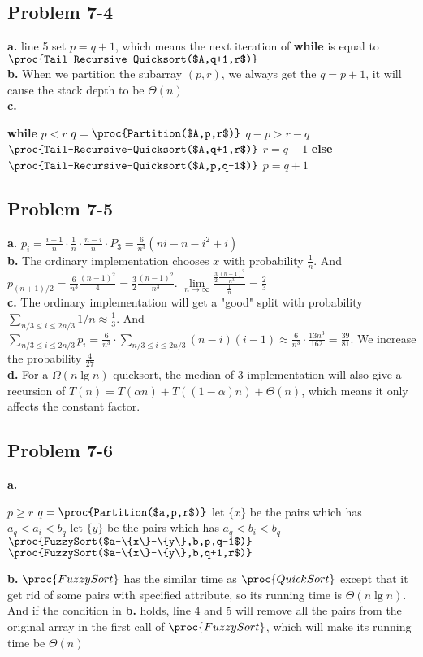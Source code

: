 \documentclass[12pt]{article}
\theoremstyle{definition}
\theoremstyle{remark}
\begin{document}
\subsection*{Problem 7-4}
\textbf{a.} line 5 set $p=q+1$, which means the next iteration of \textbf{while} is equal to $\proc{Tail-Recursive-Quicksort($A,q+1,r$)}$\\
\textbf{b.} When we partition the subarray $(p,r)$, we always get the $q=p+1$, it will cause the stack depth to be $\Theta(n)$\\
\textbf{c.}
\begin{codebox}
\li \textbf{while} $p<r$
\li $q=\proc{Partition($A,p,r$)}$
\li \If $q-p > r-q$
\li \quad $\proc{Tail-Recursive-Quicksort($A,q+1,r$)}$
\li \quad $r=q-1$
\li \textbf{else}
\li \quad $\proc{Tail-Recursive-Quicksort($A,p,q-1$)}$
\li \quad $p=q+1$
\end{codebox}
\subsection*{Problem 7-5}
\textbf{a.} $p_i=\frac{i-1}{n}\cdot\frac{1}{n}\cdot\frac{n-i}{n}\cdot P_3=\frac{6}{n^3}(ni-n-i^2+i)$\\
\textbf{b.} The ordinary implementation chooses $x$ with probability $\frac{1}{n}$. And $p_{(n+1)/2}=\frac{6}{n^3}\frac{(n-1)^2}{4}=\frac{3}{2}\frac{(n-1)^2}{n^3}$. $\lim\limits_{n\to \infty}\frac{\frac{3}{2}\frac{(n-1)^2}{n^3}}{\frac{1}{n}}=\frac{2}{3}$\\
\textbf{c.} The ordinary implementation will get a "good" split with probability $\sum\limits_{n/3\le i\le 2n/3}{1/n}\approx\frac{1}{3}$. And $\sum\limits_{n/3\le i\le 2n/3}p_i=\frac{6}{n^3}\cdot\sum\limits_{n/3\le i\le 2n/3}(n-i)(i-1)\approx\frac{6}{n^3}\cdot\frac{13n^3}{162}=\frac{39}{81}$. We increase the probability $\frac{4}{27}$\\
\textbf{d.} For a $\Omega(n\lg n)$ quicksort, the median-of-3 implementation will also give a recursion of $T(n)=T(\alpha n)+T((1-\alpha)n)+\Theta(n)$, which means it only affects the constant factor.
\subsection*{Problem 7-6}
\textbf{a.}
\begin{codebox}
\li \If $p\ge r$
\li \quad \Return
\li $q=\proc{Partition($a,p,r$)}$
\li let $\{x\}$ be the pairs which has $a_q<a_i<b_q$
\li let $\{y\}$ be the pairs which has $a_q<b_i<b_q$
\li $\proc{FuzzySort($a-\{x\}-\{y\},b,p,q-1$)}$
\li $\proc{FuzzySort($a-\{x\}-\{y\},b,q+1,r$)}$
\end{codebox}
\textbf{b.} $\proc{FuzzySort}$ has the similar time as $\proc{QuickSort}$ except that it get rid of some pairs with specified attribute, so its running time is $\Theta(n\lg n)$. And if the condition in \textbf{b.} holds, line 4 and 5 will remove all the pairs from the original array in the first call of $\proc{FuzzySort}$, which will make its running time be $\Theta(n)$
\end{document}
